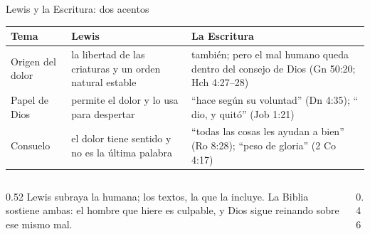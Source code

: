 \begin{frame}{Lewis y la Escritura: dos acentos}
\scriptsize\renewcommand{\arraystretch}{1.2}
\begin{tabular}{@{}>{\RaggedRight\arraybackslash}p{2.6cm}>{\RaggedRight\arraybackslash}p{4.4cm}>{\RaggedRight\arraybackslash}p{4.8cm}@{}}
\toprule
\textbf{Tema} & \textbf{Lewis} & \textbf{La Escritura} \\ \midrule
Origen del dolor & la libertad de las criaturas y un orden natural estable & también; pero el mal humano queda dentro del consejo de Dios (Gn 50:20; Hch 4:27--28) \\
Papel de Dios & permite el dolor y lo usa para despertar & ``hace según su voluntad'' (Dn 4:35); ``\SENOR{} dio, y \SENOR{} quitó'' (Job 1:21) \\
Consuelo & el dolor tiene sentido y no es la última palabra & ``todas las cosas les ayudan a bien'' (Ro 8:28); ``peso de gloria'' (2 Co 4:17) \\
\bottomrule
\end{tabular}\par\medskip
\begin{columns}[t,onlytextwidth]
\begin{column}{0.52\textwidth}\small
Lewis subraya la  humana; los textos, la  que la incluye. La Biblia sostiene ambas: el hombre que hiere es culpable, y Dios sigue reinando sobre ese mismo mal.
\end{column}
\begin{column}{0.46\textwidth}
\end{column}
\end{columns}
\end{frame}


